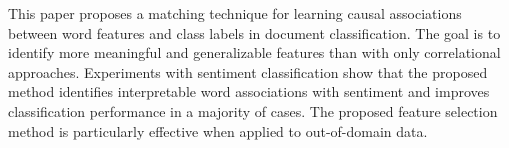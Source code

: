 This paper proposes a matching technique for learning causal associations between word features and class labels in document classification. The goal is to identify more meaningful and generalizable features than with only correlational approaches. Experiments with sentiment classification show that the proposed method identifies interpretable word associations with sentiment and improves classification performance in a majority of cases. The proposed feature selection method is particularly effective when applied to out-of-domain data.
